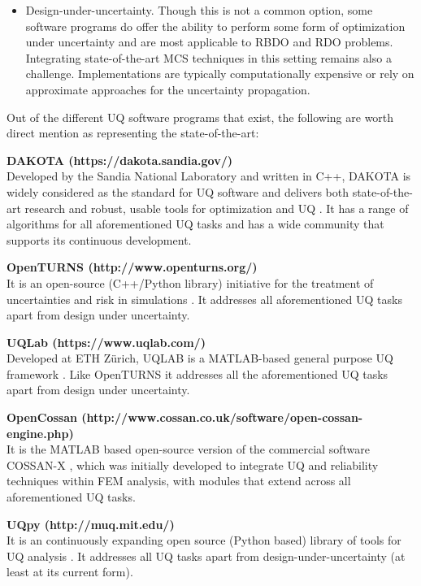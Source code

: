 \begin{itemize}
    \item Design-under-uncertainty. Though this is not a common option, some software programs do offer the ability to perform some form of optimization under uncertainty and are most applicable to RBDO and RDO problems. Integrating state-of-the-art MCS techniques in this setting remains also a challenge. Implementations are typically computationally expensive or rely on approximate approaches for the uncertainty propagation.
\end{itemize}

\noindent Out of the different UQ software programs that exist, the following are worth direct mention as representing the state-of-the-art: 
\newline

\noindent\textbf{DAKOTA (https://dakota.sandia.gov/)} \\Developed by the Sandia National Laboratory and written in C++, DAKOTA is widely considered as the standard for UQ software and delivers both state-of-the-art research and robust, usable tools for optimization and UQ \citep{adams2009dakota}. It has a range of algorithms for all aforementioned UQ tasks and has a wide community that supports its continuous development. 

\noindent\textbf{OpenTURNS (http://www.openturns.org/)} \\It is an open-source (C++/Python library) initiative for the treatment of uncertainties and risk in simulations \citep{andrianov2007open}. It addresses all aforementioned UQ tasks apart from design under uncertainty. 

\noindent\textbf{UQLab (https://www.uqlab.com/)} \\Developed at ETH Zürich, UQLAB is a MATLAB-based general purpose UQ framework \citep{marelli2014uqlab}. Like OpenTURNS it addresses all the aforementioned UQ tasks apart from design under uncertainty. 
\newline

\noindent\textbf{OpenCossan (http://www.cossan.co.uk/software/open-cossan-engine.php)} \\It is the MATLAB based open-source version of the commercial software COSSAN-X \citep{patelli2017cossan}, which was initially developed to integrate UQ and reliability techniques within FEM analysis, with modules that extend across all aforementioned UQ tasks.

\noindent\textbf{UQpy  (http://muq.mit.edu/)} \\It is an continuously expanding open source (Python based) library of tools for UQ analysis \citep{olivier2020uqpy}. It addresses all UQ tasks apart from design-under-uncertainty (at least at its current form).

